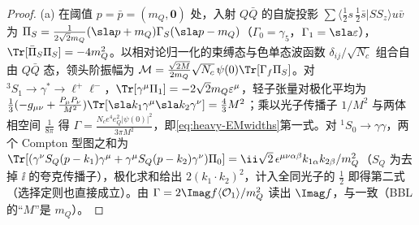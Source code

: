 \begin{proof}
(a) 在阈值 $p=\bar p=(m_Q,\bm0)$ 处，入射 $Q\bar Q$ 的自旋投影 $\sum\langle\frac12s\,\frac12\bar s|SS_z\rangle u\bar v$ 为
$\Pi_S=\frac{1}{2\sqrt2m_Q}(\sla p+m_Q)\Gamma_S(\sla p-m_Q)$（$\Gamma_0=\gamma_5$，$\Gamma_1=\sla\varepsilon$），$\Tr[\bar\Pi_S\Pi_S]=-4m_Q^2$。以相对论归一化的束缚态与色单态波函数 $\delta_{ij}/\sqrt{N_c}$ 组合自由 $Q\bar Q$ 态，领头阶振幅为 $\mathcal M=\frac{\sqrt{2M}}{2m_Q}\sqrt{N_c}\,\psi(0)\Tr[\Gamma_f\Pi_S]$。对 ${}^3S_1\to\gamma^*\to\ell^+\ell^-$，$\Tr[\gamma^\mu\Pi_1]=-2\sqrt2m_Q\varepsilon^\mu$，轻子张量对极化平均为 $\frac13(-g_{\mu\nu}+\frac{P_\mu P_\nu}{M^2})\Tr[\sla k_1\gamma^\mu\sla k_2\gamma^\nu]=\frac43M^2$；乘以光子传播子 $1/M^2$ 与两体相空间 $\frac1{8\pi}$ 得 $\Gamma=\frac{N_ce^4e_Q^2|\psi(0)|^2}{3\pi M^2}$，即\cref{eq:heavy-EMwidths}第一式。对 ${}^1S_0\to\gamma\gamma$，两个 Compton 型图之和为 $\Tr[(\gamma^\nu S_Q(p-k_1)\gamma^\mu+\gamma^\mu S_Q(p-k_2)\gamma^\nu)\Pi_0]=\ii\sqrt2\,\epsilon^{\mu\nu\alpha\beta}k_{1\alpha}k_{2\beta}/m_Q^2$（$S_Q$ 为去掉 $\ii$ 的夸克传播子），极化求和给出 $2(k_1\cdot k_2)^2$，计入全同光子的 $\frac12$ 即得第二式（选择定则也直接成立）。由 $\Gamma=2\Imag f\langle\mathcal O_1\rangle/m_Q^2$ 读出 $\Imag f$，与\cite[式~(A31)、(A34)]{BodwinBraatenLepage1995}一致（BBL 的“$M$”是 $m_Q$）。


\end{proof}
